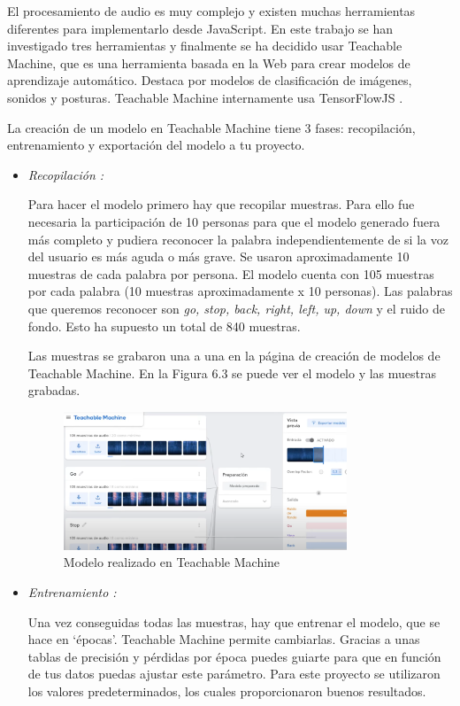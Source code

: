 El procesamiento de audio es muy complejo y existen muchas herramientas diferentes para implementarlo desde JavaScript. En este trabajo se han investigado tres herramientas y finalmente se ha decidido usar Teachable Machine, que es una herramienta basada en la Web para crear modelos de aprendizaje automático. Destaca por modelos de clasificación de imágenes, sonidos y posturas. Teachable Machine internamente usa TensorFlowJS . 

La creación de un modelo en Teachable Machine tiene 3 fases: recopilación, entrenamiento y exportación del modelo a tu proyecto.

\begin{itemize}
\item \textit{Recopilación :}

Para hacer el modelo primero hay que recopilar muestras. Para ello fue necesaria la participación de 10 personas para que el modelo generado fuera más completo y pudiera reconocer la palabra independientemente de si la voz del usuario es más aguda o más grave.  Se usaron aproximadamente 10 muestras de cada palabra por persona. El modelo cuenta con 105 muestras por cada palabra (10 muestras aproximadamente x 10 personas). Las palabras que queremos reconocer son \textit{go, stop, back, right, left, up, down } y el ruido de fondo. Esto ha supuesto un total de 840 muestras.

Las muestras se grabaron una a una en la página de creación de modelos de Teachable Machine. En la Figura 6.3 se puede ver el modelo y las muestras grabadas.


\begin{figure}[H]
 \centering
    \includegraphics[width=0.8\textwidth, height=0.4\textwidth]{chapters/images/teachablemachine.png}
    \caption{Modelo realizado en Teachable Machine}
\end{figure}
 

\item  \textit{Entrenamiento :}

Una vez conseguidas todas las muestras, hay que entrenar el modelo, que se hace en `épocas'. Teachable Machine permite cambiarlas. Gracias a unas tablas de precisión y pérdidas por época puedes guiarte para que en función de tus datos puedas ajustar este parámetro. Para este proyecto se utilizaron los valores predeterminados, los cuales proporcionaron buenos resultados.


\end{itemize}

